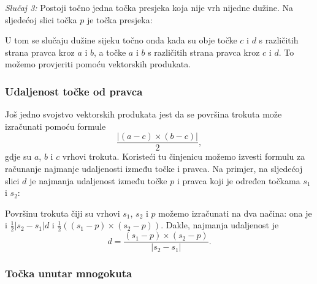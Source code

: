 \textit{Slučaj 3:}
Postoji točno jedna točka presjeka
koja nije vrh nijedne dužine.
Na sljedećoj slici točka $p$
je točka presjeka:
\begin{center}
\end{center}

U tom se slučaju dužine sijeku
točno onda kada su obje točke $c$ i $d$
s različitih strana pravca kroz $a$ i $b$,
a točke $a$ i $b$ s različitih
strana pravca kroz $c$ i $d$.
To možemo provjeriti pomoću vektorskih produkata.

\subsubsection{Udaljenost točke od pravca}

Još jedno svojstvo vektorskih produkata jest da se
površina trokuta može izračunati
pomoću formule
\[\frac{| (a-c) \times (b-c) |}{2},\]
gdje su $a$, $b$ i $c$ vrhovi trokuta.
Koristeći tu činjenicu možemo izvesti formulu
za računanje najmanje udaljenosti između točke i pravca.
Na primjer, na sljedećoj slici $d$ je
najmanja udaljenost između točke $p$ i pravca
koji je određen točkama $s_1$ i $s_2$:
\begin{center}
\end{center}

Površinu trokuta čiji su vrhovi
$s_1$, $s_2$ i $p$ možemo izračunati na dva načina:
ona je i
$\frac{1}{2} |s_2-s_1| d$ i
$\frac{1}{2} ((s_1-p) \times (s_2-p))$.
Dakle, najmanja udaljenost je
\[ d = \frac{(s_1-p) \times (s_2-p)}{|s_2-s_1|} .\]

\subsubsection{Točka unutar mnogokuta}

